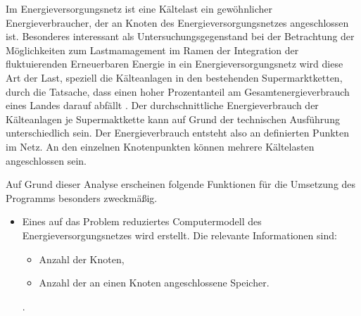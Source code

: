 
Im Energieversorgungsnetz ist eine Kältelast ein gewöhnlicher Energieverbraucher, der an Knoten des Energieversorgungsnetzes
angeschlossen ist. Besonderes interessant als Untersuchungsgegenstand bei der Betrachtung der Möglichkeiten zum Lastmamagement
im Ramen der Integration der fluktuierenden Erneuerbaren Energie in ein Energieversorgungsnetz wird diese Art der Last,
speziell die Kälteanlagen in den bestehenden Supermarktketten, durch die Tatsache, dass einen hoher Prozentanteil am
Gesamtenergieverbrauch eines Landes darauf abfällt \cite{doctor}. Der durchschnittliche Energieverbrauch der Kälteanlagen je
Supermaktkette kann auf Grund der technischen Ausführung unterschiedlich sein. Der Energieverbrauch entsteht also an
definierten Punkten im Netz. An den einzelnen Knotenpunkten können mehrere Kältelasten angeschlossen sein.

Auf Grund dieser Analyse erscheinen folgende Funktionen für die Umsetzung des Programms besonders zweckmäßig.

\begin{itemize}
\item Eines auf das Problem reduziertes Computermodell des Energieversorgungsnetzes wird erstellt. Die relevante
Informationen sind:
	\begin{itemize}
		\item Anzahl der Knoten,
		\item Anzahl der an einen Knoten angeschlossene Speicher.
	\end{itemize}.
\end{itemize}
